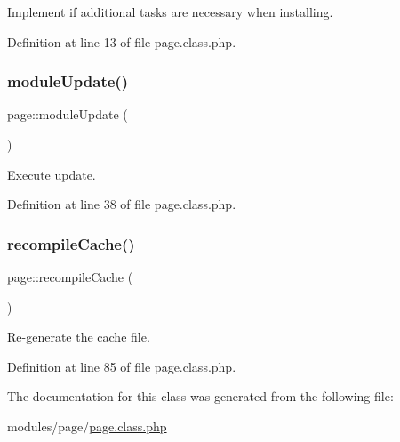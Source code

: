 Implement if additional tasks are necessary when installing. 



Definition at line 13 of file page.\+class.\+php.

\hypertarget{classpage_a4fe60dcc5953114b95b52dd89d9ba3db}{}\label{classpage_a4fe60dcc5953114b95b52dd89d9ba3db} 
\subsubsection{\texorpdfstring{module\+Update()}{moduleUpdate()}}
{\footnotesize\ttfamily page\+::module\+Update (\begin{DoxyParamCaption}{ }\end{DoxyParamCaption})}



Execute update. 



Definition at line 38 of file page.\+class.\+php.

\hypertarget{classpage_a0943a9455bc9f6c904f29235b3234e14}{}\label{classpage_a0943a9455bc9f6c904f29235b3234e14} 
\subsubsection{\texorpdfstring{recompile\+Cache()}{recompileCache()}}
{\footnotesize\ttfamily page\+::recompile\+Cache (\begin{DoxyParamCaption}{ }\end{DoxyParamCaption})}



Re-\/generate the cache file. 



Definition at line 85 of file page.\+class.\+php.



The documentation for this class was generated from the following file\+:\begin{DoxyCompactItemize}
\item 
modules/page/\hyperlink{page_8class_8php}{page.\+class.\+php}\end{DoxyCompactItemize}
